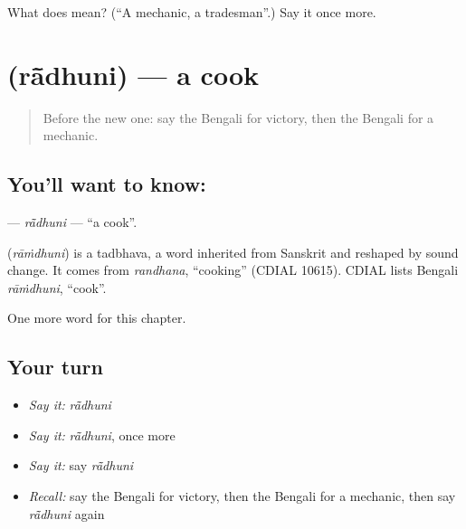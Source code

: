 \begin{tcolorbox}[breakable,colback=teal!4,colframe=teal!35!black,title={Before you move on}]
What does  mean? (\textquotedblleft{}A mechanic, a tradesman\textquotedblright{}.) Say it once more.
\end{tcolorbox}
\section[\texorpdfstring{\bn{রাঁধুনি} (rā̃dhuni)}{রাঁধুনি (rā̃dhuni)}]{ (rā̃dhuni) — a cook}

\label{lesson:BN-C261-radhuni}



\begin{quote}
Before the new one: say the Bengali for victory, then the Bengali for a mechanic.
\end{quote}

\subsection*{You'll want to know: }
\textbf{} — \emph{rā̃dhuni} — \textquotedblleft{}a cook\textquotedblright{}.

\begin{cousinweb}
\textbf{} (\emph{rāṁdhuni}) is a tadbhava, a word inherited from Sanskrit and reshaped by sound change. It comes from \emph{randhana}, \textquotedblleft{}cooking\textquotedblright{} (CDIAL 10615). CDIAL lists Bengali \emph{rāṁdhuni}, \textquotedblleft{}cook\textquotedblright{}.
\end{cousinweb}

\begin{grammarlens}[title={What you've built}]
One more word for this chapter.
\end{grammarlens}

\subsection*{Your turn}
\begin{itemize}
\raggedright
  \item \emph{Say it:} \emph{rā̃dhuni}
  \item \emph{Say it:} \emph{rā̃dhuni}, once more
  \item \emph{Say it:} say \emph{rā̃dhuni}
  \item \emph{Recall:} say the Bengali for victory, then the Bengali for a mechanic, then say \emph{rā̃dhuni} again
\end{itemize}

